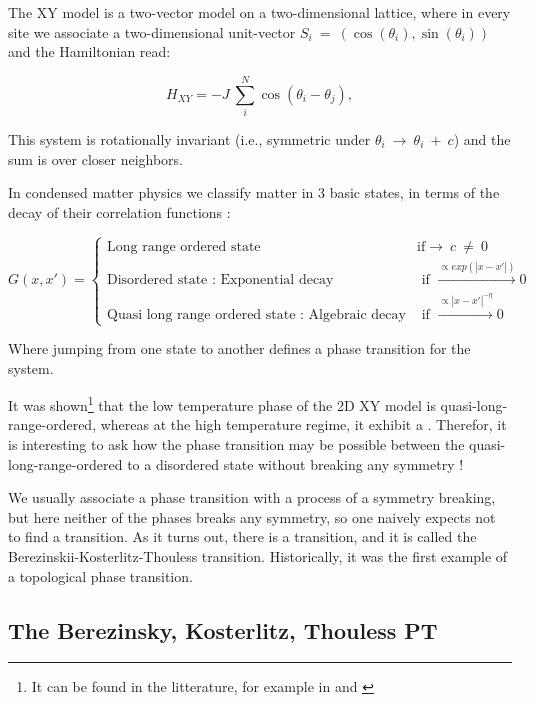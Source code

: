 \documentclass[a4paper,11pt]{article}
\begin{document}
The XY model is a two-vector model on a two-dimensional lattice, where in every site we associate a two-dimensional
unit-vector $S_i~=~(\cos(\theta_i),\sin(\theta_i))$ and the Hamiltonian read:

\begin{equation}
H_{XY}= -J~\sum_{i}^N \cos(\theta_i - \theta_{j}),
\label{Hxy}
\end{equation}

This system is rotationally invariant (i.e., symmetric under $\theta_i~\rightarrow~\theta_i~+~c$) and the sum is over closer neighbors.

In condensed matter physics we classify matter in 3 basic states, in terms of the decay of their correlation functions \cite{correlation} :

\begin{equation}
G(x,x')=
\begin{cases}
\text{Long range ordered state} &\text{if} \rightarrow~c~\neq~0\\
\text{Disordered state : Exponential decay} &\text{ if $\xrightarrow{\propto exp(|x-x'|)} 0$}\\
\text{Quasi long range ordered state : Algebraic decay} &\text{ if $\xrightarrow{\propto |x-x'|^{-\eta}} 0$}
\end{cases}
\label{corrr}
\end{equation}

Where jumping from one state to another defines a phase transition for the system.

It was shown\footnote{It can be found in the litterature, for example in \cite{correlation} and \cite{corr2}} that the low temperature phase of the 2D XY model is quasi-long-range-ordered, whereas at the high temperature regime, it exhibit a . Therefor, it is interesting to ask how the phase transition may be possible between the quasi-long-range-ordered to a disordered state without breaking any symmetry !

We usually associate a phase transition with a process of a symmetry breaking, but here neither of the phases breaks any symmetry, so one naively expects not to find a transition. As it turns out, there is a transition, and it is called the Berezinskii-Kosterlitz-Thouless transition. Historically, it was the first example of a topological phase transition.

\subsection{The Berezinsky, Kosterlitz, Thouless PT}
\end{document}
